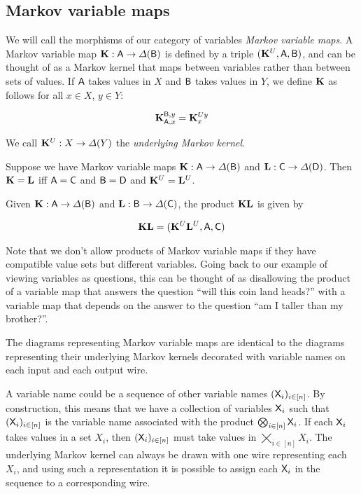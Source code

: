 \subsection{Markov variable maps}\label{sec:labeled_kernels}

We will call the morphisms of our category of variables \emph{Markov variable maps}. A Markov variable map $\mathbf{K}:\mathsf{A}\to \Delta(\mathsf{B})$ is defined by a triple $(\mathbf{K}^U,\mathsf{A},\mathsf{B})$, and can be thought of as a Markov kernel that maps between variables rather than between sets of values. If $\mathsf{A}$ takes values in $X$ and $\mathsf{B}$ takes values in $Y$, we define $\mathbf{K}$ as follows for all $x\in X$, $y\in Y$:

\begin{align}
	\mathbf{K}_{\mathsf{A},x}^{\mathsf{B},y}  = \mathbf{K}^{U y}_x
\end{align}

We call $\mathbf{K}^U:X\to \Delta(Y)$ the \emph{underlying Markov kernel}.

Suppose we have Markov variable maps $\mathbf{K}:\mathsf{A}\to \Delta(\mathsf{B})$ and $\mathbf{L}:\mathsf{C}\to \Delta(\mathsf{D})$. Then $\mathbf{K}=\mathbf{L}$ iff $\mathsf{A}= \mathsf{C}$ and $\mathsf{B}= \mathsf{D}$ and $\mathbf{K}^U=\mathbf{L}^U$.

Given $\mathbf{K}:\mathsf{A}\to \Delta(\mathsf{B})$ and $\mathbf{L}:\mathsf{B}\to \Delta(\mathsf{C})$, the product $\mathbf{K}\mathbf{L}$ is given by

\begin{align}
	\mathbf{K}\mathbf{L} = (\mathbf{K}^U\mathbf{L}^U,\mathsf{A},\mathsf{C})
\end{align}

Note that we don't allow products of Markov variable maps if they have compatible value sets but different variables. Going back to our example of viewing variables as questions, this can be thought of as disallowing the product of a variable map that answers the question ``will this coin land heads?'' with a variable map that depends on the answer to the question ``am I taller than my brother?''.

The diagrams representing Markov variable maps are identical to the diagrams representing their underlying Markov kernels decorated with variable names on each input and each output wire. 

A variable name could be a sequence of other variable names $(\mathsf{X}_i)_{i\in [n]}$. By construction, this means that we have a collection of variables $\mathsf{X}_i$ such that $(\mathsf{X}_i)_{i\in [n]}$ is the variable name associated with the product $\bigotimes_{i\in [n]} \mathsf{X}_i$. If each $\mathsf{X}_i$ takes values in a set $X_i$, then $(\mathsf{X}_i)_{i\in [n]}$ must take values in $\bigtimes_{i\in [n]} X_i$. The underlying Markov kernel can always be drawn with one wire representing each $X_i$, and using such a representation it is possible to assign each $\mathsf{X}_i$ in the sequence to a corresponding wire.

